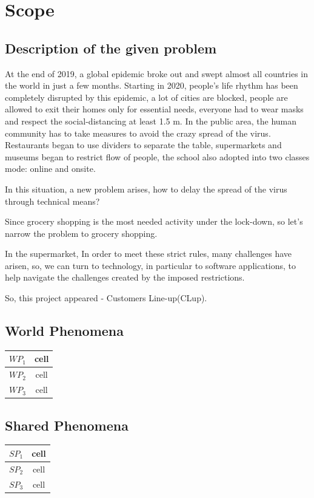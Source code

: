 \documentclass[a4paper,12pt]{book}
\begin{document}
\section{Scope}
\subsection{Description of the given problem}

At the end of 2019, a global epidemic broke out and swept almost all countries in the world in just a few months. Starting in 2020, people's life rhythm has been completely disrupted by this epidemic, a lot of cities are blocked, people are allowed to exit their homes only for essential needs, everyone had to wear masks and respect the social-distancing at least 1.5 m. In the public area, the human community has to take measures to avoid the crazy spread of the virus. Restaurants began to use dividers to separate the table, supermarkets and museums began to restrict flow of people, the school also adopted into two classes mode: online and onsite.

In this situation, a new problem arises, how to delay the spread of the virus through technical means? 

Since grocery shopping is the most needed activity under the lock-down, so let’s narrow the problem to grocery shopping.

In the supermarket, In order to meet these strict rules, many challenges have arisen, so, we can turn to technology, in particular to software applications, to help navigate the challenges created by the imposed restrictions.

So, this project appeared - Customers Line-up(CLup).

\subsection{World Phenomena}

\begin{center}
	\begin{tabular}{ c|c } 
		\hline
		$WP_1$ & cell \\ 
		\hline
		$WP_2$ & cell \\ 
		\hline
		$WP_3$ & cell \\ 
		\hline
	\end{tabular}
\end{center}

\subsection{Shared Phenomena}
\begin{center}
	\begin{tabular}{ c|c } 
		\hline
		$SP_1$ & cell \\ 
		\hline
		$SP_2$ & cell \\ 
		\hline
		$SP_3$ & cell \\ 
		\hline
	\end{tabular}
\end{center}
\end{document}
